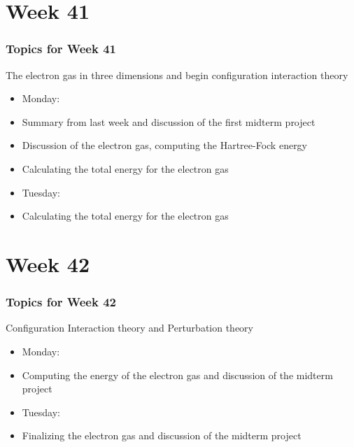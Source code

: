 


\frame[containsverbatim]


\section{Week 41}
\frame
{
  \frametitle{Topics for Week 41}
  \begin{block}{The electron gas in three dimensions and begin configuration interaction theory}
\begin{itemize}
\item Monday:
\item Summary from last week and discussion of the first midterm project
\item Discussion of the electron gas, computing the Hartree-Fock energy 
\item Calculating the total energy for the electron gas
\item Tuesday:
\item Calculating the total energy for the electron gas
\end{itemize}
  \end{block}
} 

\section{Week 42}
\frame
{
  \frametitle{Topics for Week 42}
  \begin{block}{Configuration Interaction theory and Perturbation theory}
\begin{itemize}
\item Monday:
\item Computing the energy of the electron gas and discussion of the midterm project
\item Tuesday:
\item Finalizing the electron gas and discussion of the midterm project
\end{itemize}
  \end{block}
} 



